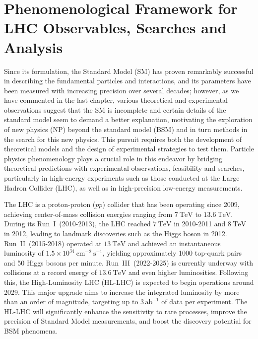 \chapter{Phenomenological Framework for LHC Observables, Searches and Analysis}

Since its formulation, the Standard Model (SM) has proven remarkably successful in describing the fundamental particles and interactions, and its parameters have been measured with increasing precision over several decades; however, as we have commented in the last chapter, various theoretical and experimental observations suggest that the SM is incomplete and certain details of the standard model seem to demand a better explanation, motivating the exploration of new physics (NP) beyond the standard model (BSM) and in turn methods in the search for this new physics. This pursuit requires both the development of theoretical models and the design of experimental strategies to test them. Particle physics phenomenology plays a crucial role in this endeavor by bridging theoretical predictions with experimental observations, feasibility and searches, particularly in high-energy experiments such as those conducted at the Large Hadron Collider (LHC), as well as in high-precision low-energy measurements.

The LHC is a proton-proton ($pp$) collider that has been operating since 2009, achieving center-of-mass collision energies ranging from $7~\mathrm{TeV}$ to $13.6~\mathrm{TeV}$. During its Run~I~(2010-2013), the LHC reached $7~\mathrm{TeV}$ in 2010-2011 and $8~\mathrm{TeV}$ in 2012, leading to landmark discoveries such as the Higgs boson in 2012. Run~II~(2015-2018) operated at $13~\mathrm{TeV}$ and achieved an instantaneous luminosity of $1.5 \times 10^{34}~\mathrm{cm}^{-2}~\mathrm{s}^{-1}$, yielding approximately 1000 top-quark pairs and 50 Higgs bosons per minute. Run~III~(2022-2025) is currently underway with collisions at a record energy of $13.6~\mathrm{TeV}$ and even higher luminosities. Following this, the High-Luminosity LHC (HL-LHC) is expected to begin operations around 2029. This major upgrade aims to increase the integrated luminosity by more than an order of magnitude, targeting up to $3\,\mathrm{ab}^{-1}$ of data per experiment. The HL-LHC will significantly enhance the sensitivity to rare processes, improve the precision of Standard Model measurements, and boost the discovery potential for BSM phenomena.

